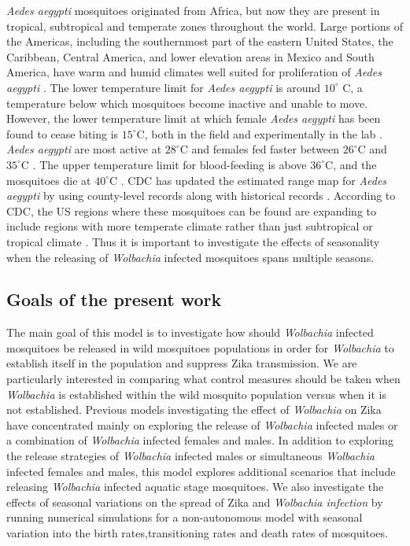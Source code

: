 \documentclass{ws-rv9x6}
\begin{document}

\textit{Aedes aegypti} mosquitoes originated from Africa, but now they are present in tropical, subtropical and temperate zones throughout the world. Large portions of the Americas, including the southernmost part of the eastern United States, the Caribbean, Central America, and lower elevation areas in Mexico and South America, have warm and humid climates well suited for proliferation of \textit{Aedes aegypti} \cite{world2009dengue}. 
The lower temperature limit for \textit{Aedes aegypti} is around $10^{\circ}$ C, a temperature below which mosquitoes become inactive and unable to move. However, the  lower temperature limit at which female \textit{Aedes aegypti} has been found to cease biting is $15^{\circ}$C, both in the field and experimentally in the lab \cite{marchoux1903fievre}. 
\textit{Aedes aegypti} are most active at $28^{\circ}$C \cite{connor1924suggestions} and females fed faster between $26^{\circ}$C and $35^{\circ}$C \cite{marchoux1903fievre}. The upper temperature limit for blood-feeding is above $36^{\circ}$C, and the mosquitoes die at $40^{\circ}$C \cite{christophers1960aedes}.
CDC has updated the estimated range map for \textit{Aedes aegypti} by using county-level records along with historical records \cite{centers2018estimated}. According to CDC, the US regions where these mosquitoes can be found are expanding to include regions with more temperate climate rather than just subtropical or tropical climate \cite{centers2018estimated}. Thus it is important to investigate the effects of seasonality when the releasing of \textit{Wolbachia} infected mosquitoes spans multiple seasons.

\subsection{Goals of the present work}
The main goal of this model is to investigate how should \textit{Wolbachia} infected mosquitoes be released in wild mosquitoes populations in order for \textit{Wolbachia} to establish itself in the population and suppress Zika transmission. We are particularly interested in comparing what control measures should be taken when \textit{Wolbachia} is established within the wild mosquito population versus when it is not established. Previous models investigating the effect of \textit{Wolbachia} on Zika have concentrated mainly on exploring the release of \textit{Wolbachia} infected males or a combination of \textit{Wolbachia} infected females and males. In addition to exploring the release strategies of \textit{Wolbachia} infected males or simultaneous \textit{Wolbachia} infected females and males, this model explores  additional scenarios that include releasing \textit{Wolbachia} infected aquatic stage mosquitoes. We also investigate the effects of seasonal variations on the spread of Zika and \textit{Wolbachia infection} by running numerical simulations for a non-autonomous model with  seasonal variation into the birth rates,transitioning rates and death rates of mosquitoes.
\end{document}
